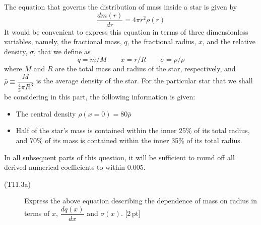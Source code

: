 The equation that governs the distribution of mass inside a star is given by
\[ \frac{dm(r)}{dr} = 4\pi r^2 \rho(r) \]
It would be convenient to express this equation in terms of three dimensionless
variables, namely, the fractional mass, $q$, the fractional radius, $x$, and
the relative density, $\sigma$, that we define as
\[ q = m/M \qquad x = r/R \qquad \sigma = \rho/\bar{\rho} \]
where $M$ and $R$ are the total mass and radius of the star, respectively, and
$\bar{\rho} \equiv \dfrac{M}{\frac{4}{3}\pi R^3}$ is the average density of the
star. For the particular star that we shall be considering in this part, the
following information is given:
\begin{itemize}
\item The central density $\rho(x = 0) = 80\bar{\rho}$
\item Half of the star's mass is contained within the inner 25\% of its total
  radius, and 70\% of its mass is contained within the inner 35\% of its total
  radius.
\end{itemize}
In all subsequent parts of this question, it will be sufficient to round off
all derived numerical coefficients to within 0.005.
\begin{description}
\item[(T11.3a)] Express the above equation describing the dependence of mass on
  radius in terms of $x$, $\dfrac{dq(x)}{dx}$ and $\sigma(x)$. \hfill[2\,pt]
\end{description}

